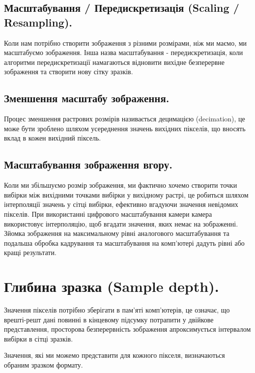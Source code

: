 \documentclass[11pt]{article}
\begin{document}
    \subsection{Масштабування / Передискретизація (Scaling / Resampling).}\label{subsec:scaling_resampling}
    Коли нам потрібно створити зображення з різними розмірами, ніж ми маємо, ми масштабуємо зображення.
    Інша назва масштабування - передискретизація, коли алгоритми передискретизації намагаються відновити вихідне безперервне зображення та створити нову сітку зразків.

    \subsection{Зменшення масштабу зображення.}\label{subsec:downscaling}
    Процес зменшення растрових розмірів називається децимацією (decimation), це може бути зроблено шляхом усереднення значень вихідних пікселів, що вносять вклад в кожен вихідний піксель.

    \subsection{Масштабування зображення вгору.}\label{subsec:upscaling}
    Коли ми збільшуємо розмір зображення, ми фактично хочемо створити точки вибірки між вихідними точками вибірки у вихідному растрі, це робиться шляхом інтерполяції значень у сітці вибірки, ефективно вгадуючи значення невідомих пікселів.
    При використанні цифрового масштабування камери камера використовує інтерполяцію, щоб вгадати значення, яких немає на зображенні.
    Зйомка зображення на максимальному рівні аналогового масштабування та подальша обробка кадрування та масштабування на комп'ютері дадуть рівні або кращі результати.

    \section{Глибина зразка (Sample depth).}\label{sec:sample_depth}
    Значення пікселів потрібно зберігати в пам’яті комп’ютерів, це означає, що врешті-решт дані повинні в кінцевому підсумку потрапити у двійкове представлення, просторова безперервність зображення апроксимується інтервалом вибірки в сітці зразків.

    Значення, які ми можемо представити для кожного пікселя, визначаються обраним зразком формату.
\end{document}
